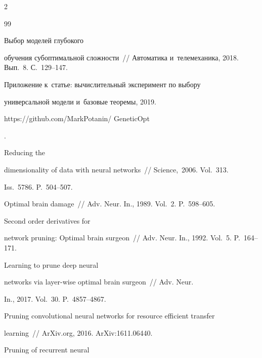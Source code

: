 \begin{multicols}{2}
{{\begin{thebibliography}{99}


 Выбор моделей глубокого 


обучения субоптимальной сложности~// Автоматика и~телемеханика, 2018. Вып.~8. С.~129--147.




 Приложение к~статье: вы\-чис\-ли\-тель\-ный эксперимент по выбору 


универсальной модели и~базовые теоремы, 2019. {\sf 


https://github.com/MarkPotanin/ GeneticOpt}.




 Reducing the 


dimensionality of data with neural networks~// Science,~2006. Vol.~313. 


Iss.~5786. P.~504--507.







 Optimal brain damage~// Adv. Neur. In., 1989. Vol.~2. P.~598--605.




 Second order derivatives for 


network pruning: Optimal brain surgeon~// Adv. Neur. In., 1992. Vol.~5. P.~164--171.




 Learning to prune deep neural 


networks via layer-wise optimal brain surgeon~// Adv. Neur. 


In., 2017.  Vol.~30. P.~4857--4867.






Pruning convolutional neural networks for resource efficient transfer


learning~// ArXiv.org, 2016. ArXiv:1611.06440.




 Pruning of recurrent neural 



\end{thebibliography}}}
\end{multicols}
